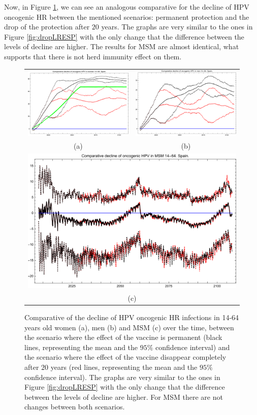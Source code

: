 Now, in Figure \ref{fig:dropHRESP}, we can see an analogous comparative for the decline of HPV oncogenic HR between the mentioned scenarios: permanent protection and the drop of the protection after $20$ years. The graphs are very similar to the ones in Figure \ref{fig:dropLRESP} with the only change that the difference between the levels of decline are higher. The results for MSM are almost identical, what supports that there is not herd immunity effect on them.

\begin{figure}[!]
	\centering
	\begin{tabular}{cc}
		\includegraphics[width=0.5\linewidth]{IMGs/5.-Caida_brusca/Decl_muj_14_64_onco_Caida.pdf}	& 
		\includegraphics[width=0.5\linewidth]{IMGs/5.-Caida_brusca/Decl_hom_14_64_onco_Caida.pdf}  \\ 
		(a)	& (b) \\ 
		\multicolumn{2}{c}{ \includegraphics[width=0.5\linewidth]{IMGs/5.-Caida_brusca/Decl_MSM_14_64_onco_Caida.pdf} } \\ 
		\multicolumn{2}{c}{(c)} \\ 
	\end{tabular} 
	\caption{Comparative of the decline of  HPV oncogenic HR infections in 14-64 years old women (a), men (b) and MSM (c) over the time, between the scenario where the effect of the vaccine is permanent (black lines, representing  the mean and the $95\%$ confidence interval) and the scenario where the effect of the vaccine disappear completely after $20$ years (red lines, representing  the mean and the $95\%$ confidence interval). The graphs are very similar to the ones in Figure \ref{fig:dropLRESP} with the only change that the difference between the levels of decline are higher. For MSM there are not changes between both scenarios.}
	\label{fig:dropHRESP}
\end{figure}

